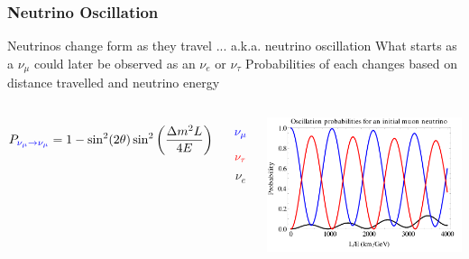 \documentclass[10pt,professionalfonts,xcolor=table]{beamer}
\begin{document}
\begin{frame}
\end{frame}

\frame
{
  \frametitle{Neutrino Oscillation}
  \bangon
  \bang Neutrinos change form as they travel
	  \bangon
	  \bing ... a.k.a. neutrino oscillation
	  \bing What starts as a $\nu_\mu$ could later be observed as an $\nu_e$ or $\nu_\tau$
	  \bing Probabilities of each changes based on distance travelled and neutrino energy
	  \bangoff
  \bangoff
\gap
\begin{columns}[c]
\begin{equation*}
P_{\color{blue}\nu_\mu \rightarrow \nu_\mu} = 1 - \sin^2(2\theta) \sin^2\bigg(\frac{\Delta m^2 L}{4 E}\bigg)
\end{equation*}
\gap
{}
\vspace{-70pt}

\begin{equation*}
\color{blue}
\nu_\mu
\end{equation*}
\vspace{-20pt}
\begin{equation*}
\color{red}
\nu_\tau
\end{equation*}
\vspace{-20pt}
\begin{equation*}
\nu_e
\end{equation*}
\gap

\includegraphics[width=1\textwidth]{figures/figures/osc_prob.png}

\end{columns}


}
\end{document}

